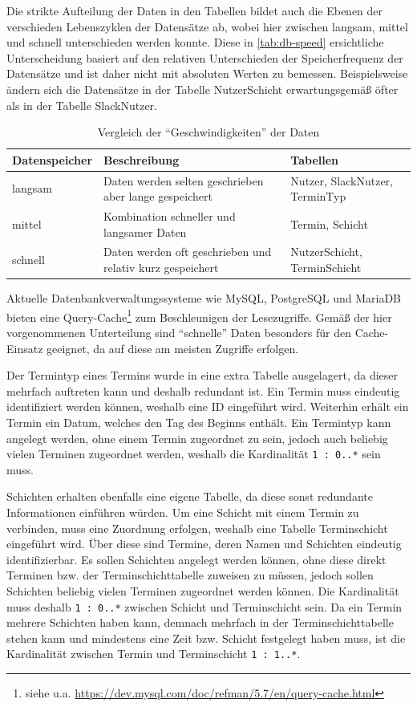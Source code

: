 Die strikte Aufteilung der Daten in den Tabellen bildet auch die Ebenen der verschieden Lebenszyklen der Datensätze ab, wobei hier zwischen langsam, mittel und schnell unterschieden werden konnte. Diese in \autoref{tab:db-speed} ersichtliche Unterscheidung basiert auf den relativen Unterschieden der Speicherfrequenz der Datensätze und ist daher nicht mit absoluten Werten zu bemessen. Beispielsweise ändern sich die Datensätze in der Tabelle NutzerSchicht erwartungsgemäß öfter als in der Tabelle SlackNutzer.

\begin{table}[H]
    \begin{tabularx}{0.9\columnwidth}{|l|X|X|}
    \hline
    \textbf{Datenspeicher} & \textbf{Beschreibung} & \textbf{Tabellen} \\
    \hline
    langsam & Daten werden selten geschrieben aber lange gespeichert & Nutzer, SlackNutzer, TerminTyp \\
    \hline
    mittel & Kombination schneller und langsamer Daten & Termin, Schicht \\
    \hline
    schnell & Daten werden oft geschrieben und relativ kurz gespeichert & NutzerSchicht, TerminSchicht \\
    \hline
    \end{tabularx}
    \caption{Vergleich der \enquote{Geschwindigkeiten} der Daten}
    \label{tab:db-speed}
\end{table}

Aktuelle Datenbankverwaltungssysteme wie MySQL, PostgreSQL und MariaDB bieten eine Query-Cache\footnote{siehe u.a. \url{https://dev.mysql.com/doc/refman/5.7/en/query-cache.html}} zum Beschleunigen der Lesezugriffe. Gemäß der hier vorgenommenen Unterteilung sind \enquote{schnelle} Daten besonders für den Cache-Einsatz geeignet, da auf diese am meisten Zugriffe erfolgen. 

Der Termintyp eines Termins wurde in eine extra Tabelle ausgelagert, da dieser mehrfach auftreten kann und deshalb redundant ist. Ein Termin muss eindeutig identifiziert werden können, weshalb eine ID eingeführt wird. Weiterhin erhält ein Termin ein Datum, welches den Tag des Beginns enthält. Ein Termintyp kann angelegt werden, ohne einem Termin zugeordnet zu sein, jedoch auch beliebig vielen Terminen zugeordnet werden, weshalb die Kardinalität \texttt{1 : 0..*} sein muss.

Schichten erhalten ebenfalls eine eigene Tabelle, da diese sonst redundante Informationen einführen würden. Um eine Schicht mit einem Termin zu verbinden, muss eine Zuordnung erfolgen, weshalb eine Tabelle Terminschicht eingeführt wird. Über diese sind Termine, deren Namen und Schichten eindeutig identifizierbar. Es sollen Schichten angelegt werden können, ohne diese direkt Terminen bzw. der Terminschichttabelle zuweisen zu müssen, jedoch sollen Schichten beliebig vielen Terminen zugeordnet werden können. Die Kardinalität muss deshalb \texttt{1 : 0..*} zwischen Schicht und Terminschicht sein. Da ein Termin mehrere Schichten haben kann, demnach mehrfach in der Terminschichttabelle stehen kann und mindestens eine Zeit bzw. Schicht festgelegt haben muss, ist die Kardinalität zwischen Termin und Terminschicht \texttt{1 : 1..*}.

